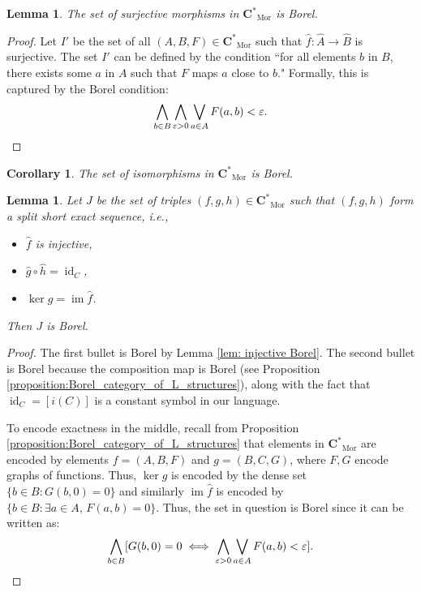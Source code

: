 \documentclass[12pt]{amsart}
\newtheorem{corollary}[theorem]{Corollary}
\newtheorem{lemma}[theorem]{Lemma}
\DeclareMathOperator{\id}{id}
\DeclareMathOperator{\Mor}{Mor}
\DeclareMathOperator{\image}{im}
\DeclareMathOperator{\kernel}{ker}
\newcommand{\Cstar}{\mathbf{C^*}} %
\begin{document}
\begin{lemma}
    The set of surjective morphisms in $\Cstar_{\Mor}$ is Borel.
\end{lemma}
\begin{proof}
    Let $I'$ be the set of all $(A, B, F) \in \Cstar_{\Mor}$ such that $\widehat{f} \colon \widehat{A} \to \widehat{B}$ is surjective.
    The set $I'$ can be defined by the condition ``for all elements $b$ in $B$, there exists some $a$ in $A$ such that $F$ maps $a$ close to $b$."
    Formally, this is captured by the Borel condition:
    \[ \bigwedge_{b \in B} \bigwedge_{\varepsilon >0} \bigvee_{a \in A} F(a,b) < \varepsilon.    \qedhere 
    \]
\end{proof}

\begin{corollary}
    The set of isomorphisms in $\Cstar_{\Mor}$ is Borel.
\end{corollary}

\begin{lemma}\label{lemma:split_SES_are_Borel}
    Let $J$ be the set of triples $(f, g, h) \in \Cstar_{\Mor}$ such that $(f,g,h)$ form a split short exact sequence, i.e.,
    \begin{itemize}
        \item $\widehat{f}$ is injective,
        \item $\widehat{g} \circ \widehat{h} = \id_C$,
        \item $\kernel \widehat{g} = \image \widehat{f}$.
    \end{itemize}
    Then $J$ is Borel.
\end{lemma}
\begin{proof}
    The first bullet is Borel by Lemma \ref{lem: injective Borel}. The second bullet is Borel because the composition map is Borel (see Proposition \ref{proposition:Borel_category_of_L_structures}), along with the fact that $\id_C = [i(C)]$ is a constant symbol in our language.

    To encode exactness in the middle, recall from Proposition \ref{proposition:Borel_category_of_L_structures} that elements in $\Cstar_{\Mor}$ are encoded by elements $f = (A, B, F)$ and $g = (B, C, G)$, where $F, G$ encode graphs of functions. Thus, $\kernel \widehat{g}$ is encoded by the dense set $\{b \in B \colon G(b,0) = 0\}$ and similarly $\image \widehat{f}$ is encoded by $\{ b \in B \colon \exists a \in A, \, F(a,b) = 0\}$. 
    Thus, the set in question is Borel since it can be written as:
    \[
        \bigwedge_{b \in B} [G(b,0) = 0 \iff \bigwedge_{\varepsilon > 0} \bigvee_{a \in A} F(a, b) < \varepsilon]. \qedhere
    \]
\end{proof}
\end{document}
